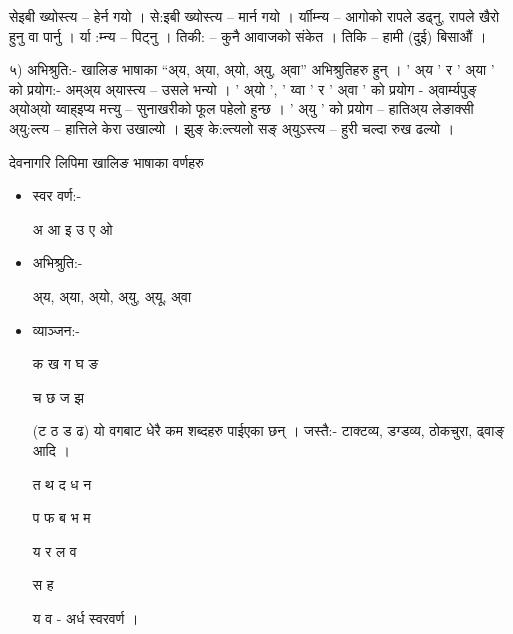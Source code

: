 सेइबी ख्योस्त्य –  हेर्न गयो । से:इबी ख्योस्त्य –  मार्न गयो ।
र्याीम्‍न्य – आगोको रापले डढ्‍नु, रापले खैरो हुनु वा पार्नु । र्या :म्‍न्य – पिट्‍नु । 
तिकी: – कुनै आवाजको संकेत । तिकि –  हामी (दुई) बिसाऔं ।

५) अभिश्रुति:- खालिङ भाषाका “अ‌्य, अ्या, अ्यो, अ्यु, अ्वा” अभिश्रुतिहरु हुन् । 
' अ्य ' र ' अ्या ' को प्रयोग:- अम्अ्य अ्यास्त्य – उसले भन्यो ।
' अ्यो ',  ' य्वा '  र  ' अ्वा ' को प्रयोग -  
अ्वार्म्यपुङ् अ्योअ्यो य्वाह्इप्य मत्त्यु – सुनाखरीको फूल पहेलो हुन्छ ।
' अ्यु ' को प्रयोग – 
हातिअ्य लेङाक्सी अ्यु:ल्त्य – हात्तिले केरा उखाल्यो ।
झुङ् के:ल्त्यलो सङ् अ्युऽस्त्य – हुरी चल्दा रुख ढल्यो ।

देवनागरि लिपिमा खालिङ भाषाका वर्णहरु
\begin{itemize}
\item स्वर वर्ण:- 

अ आ इ उ ए ओ 

\item अभिश्रुति:- 

अ्य, अ्या, अ्यो, अ्यु, अ्यू, अ्वा 

\item व्याञ्‍जन:-

क ख ग घ ङ    

च छ ज झ  

(ट ठ ड ढ) यो व\reph{}गबाट धेरै कम शब्दहरु पाईएका छन् । जस्तै:- टाक्टव्य, डग्डव्य, ठोकचुरा, ढ्वाङ् आदि ।
 
त थ द ध न 

प फ ब भ म    

य र ल व    

स  ह

य व - अर्ध स्वरवर्ण ।

\end{itemize}
